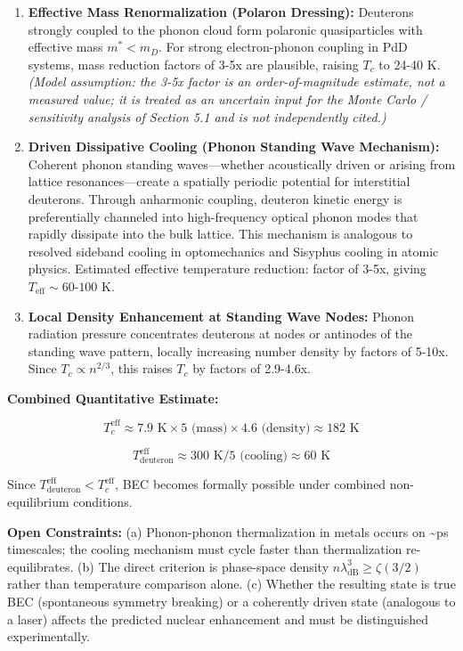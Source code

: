 \documentclass[11pt,a4paper]{article}
\begin{document}
\begin{enumerate}
\def\labelenumi{\arabic{enumi}.}
\item
  \textbf{Effective Mass Renormalization (Polaron Dressing):} Deuterons strongly coupled to the phonon cloud form polaronic quasiparticles with effective mass $m^* < m_D$. For strong electron-phonon coupling in PdD systems, mass reduction factors of 3-5x are plausible, raising $T_c$ to 24-40 K. \emph{(Model assumption: the 3-5x factor is an order-of-magnitude estimate, not a measured value; it is treated as an uncertain input for the Monte Carlo / sensitivity analysis of Section 5.1 and is not independently cited.)}
\item
  \textbf{Driven Dissipative Cooling (Phonon Standing Wave Mechanism):} Coherent phonon standing waves---whether acoustically driven or arising from lattice resonances---create a spatially periodic potential for interstitial deuterons. Through anharmonic coupling, deuteron kinetic energy is preferentially channeled into high-frequency optical phonon modes that rapidly dissipate into the bulk lattice. This mechanism is analogous to resolved sideband cooling in optomechanics and Sisyphus cooling in atomic physics. Estimated effective temperature reduction: factor of 3-5x, giving $T_{\text{eff}} \sim 60\text{-}100$ K.
\item
  \textbf{Local Density Enhancement at Standing Wave Nodes:} Phonon radiation pressure concentrates deuterons at nodes or antinodes of the standing wave pattern, locally increasing number density by factors of 5-10x. Since $T_c \propto n^{2/3}$, this raises $T_c$ by factors of 2.9-4.6x.
\end{enumerate}

\textbf{Combined Quantitative Estimate:}

\begin{equation}
T_c^{\text{eff}} \approx 7.9 \text{ K} \times 5 \text{ (mass)} \times 4.6 \text{ (density)} \approx 182 \text{ K}
\end{equation}

\begin{equation}
T_{\text{deuteron}}^{\text{eff}} \approx 300 \text{ K} / 5 \text{ (cooling)} \approx 60 \text{ K}
\end{equation}

Since $T_{\text{deuteron}}^{\text{eff}} < T_c^{\text{eff}}$, BEC becomes formally possible under combined non-equilibrium conditions.

\textbf{Open Constraints:} (a) Phonon-phonon thermalization in metals occurs on \textasciitilde ps timescales; the cooling mechanism must cycle faster than thermalization re-equilibrates. (b) The direct criterion is phase-space density $n \lambda_{\text{dB}}^3 \geq \zeta(3/2)$ rather than temperature comparison alone. (c) Whether the resulting state is true BEC (spontaneous symmetry breaking) or a coherently driven state (analogous to a laser) affects the predicted nuclear enhancement and must be distinguished experimentally.
\end{document}
